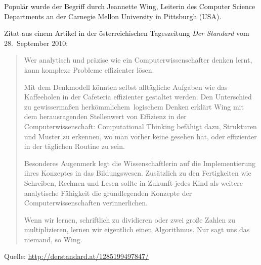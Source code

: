 Populär wurde der Begriff durch Jeannette Wing, Leiterin des Computer Science
Departments an der Carnegie Mellon University in Pittsburgh (USA).

Zitat aus einem Artikel in der österreichischen Tageszeitung \emph{Der Standard}
vom 28.\ September 2010:

\begin{quotation}
\noindent Wer analytisch und präzise wie ein Computerwissenschafter denken
lernt, kann komplexe Probleme effizienter lösen.

\noindent Mit dem Denkmodell könnten selbst alltägliche Aufgaben wie das
Kaffeeholen in der Cafeteria effizienter gestaltet werden. Den Unterschied zu
gewissermaßen \glqq herkömmlichem\grqq\ logischem Denken erklärt Wing mit dem
herausragenden Stellenwert von Effizienz in der Computerwissenschaft:
\glqq Computational Thinking befähigt dazu, Strukturen und Muster zu erkennen,
wo man vorher keine gesehen hat, oder effizienter in der täglichen Routine zu
sein.\grqq

\noindent Besonderes Augenmerk legt die Wissenschaftlerin auf die
Implementierung ihres Konzeptes in das Bildungswesen. \glqq Zusätzlich zu den
Fertigkeiten wie Schreiben, Rechnen und Lesen sollte in Zukunft jedes Kind als
weitere analytische Fähigkeit die grundlegenden Konzepte der
Computerwissenschaften verinnerlichen\grqq .

\noindent \glqq Wenn wir lernen, schriftlich zu dividieren oder zwei große
Zahlen zu multiplizieren, lernen wir eigentlich einen Algorithmus. Nur sagt uns
das niemand\grqq , so Wing.
\end{quotation}

Quelle: \url{http://derstandard.at/1285199497847/}




